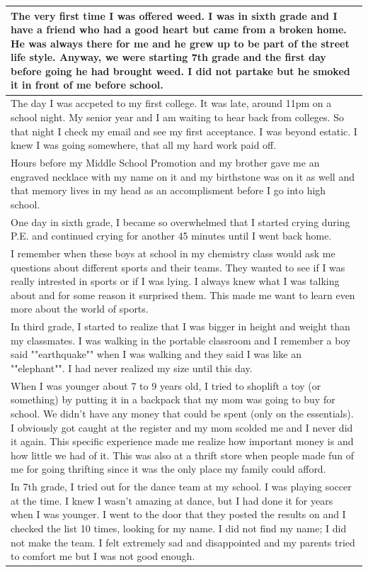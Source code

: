 \documentclass[
  .7em,
  letterpaper,
  DIV=11,
  numbers=noendperiod]{scrartcl}
\begin{document}
\begin{table}
\begin{tabular}{l}
\hline
The very first time I was offered weed. I was in sixth grade and I have a friend who had a good heart but came from a broken home. He was always there for me and he grew up to be part of the street life style. Anyway, we were starting 7th grade and the first day before going he had brought weed. I did not partake but he smoked it in front of me before school.\\
\hline
The day I was accpeted to my first college. It was late, around 11pm on a school night. My senior year and I am waiting to hear back from colleges. So that night I check my email and see my first acceptance. I was beyond estatic. I knew I was going somewhere, that all my hard work paid off.\\
\hline
Hours before my Middle School Promotion and my brother gave me an engraved necklace with my name on it and my birthstone was on it as well and that memory lives in my head as an accomplisment before I go into high school.\\
\hline
One day in sixth grade, I became so overwhelmed that I started crying during P.E. and continued crying for another 45 minutes until I went back home.\\
\hline
I remember when these boys at school in my chemistry class would ask me questions about different sports and their teams. They wanted to see if I was really intrested in sports or if I was lying. I always knew what I was talking about and for some reason it surprised them. This made me want to learn even more about the world of sports.\\
\hline
In third grade, I started to realize that I was bigger in height and weight than my classmates. I was walking in the portable classroom and I remember a boy said ""earthquake"" when I was walking and they said I was like an ""elephant"". I had never realized my size until this day.\\
\hline
When I was younger about 7 to 9 years old, I tried to shoplift a toy (or something) by putting it in a backpack that my mom was going to buy for school. We didn't have any money that could be spent (only on the essentials). I obviously got caught at the register and my mom scolded me and I never did it again. This specific experience made me realize how important money is and how little we had of it. This was also at a thrift store when people made fun of me for going thrifting since it was the only place my family could afford.\\
\hline
In 7th grade, I tried out for the dance team at my school. I was playing soccer at the time. I knew I wasn't amazing at dance, but I had done it for years when I was younger. I went to the door that they posted the results on and I checked the list 10 times, looking for my name. I did not find my name; I did not make the team. I felt extremely sad and disappointed and my parents tried to comfort me but I was not good enough.\\

\end{tabular}
\end{table}
\end{document}
